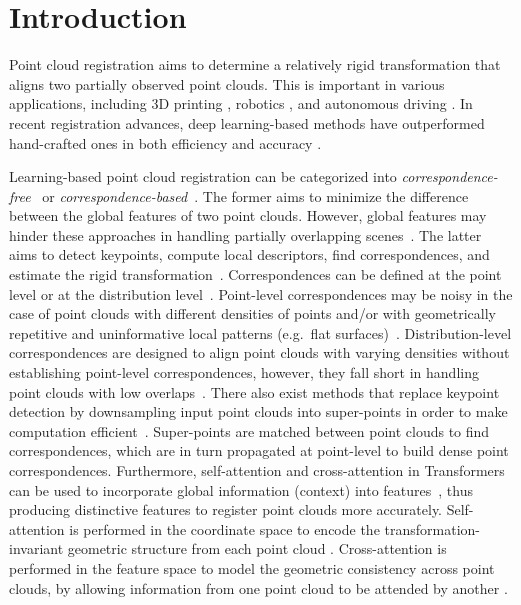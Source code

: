 \section{Introduction}
\label{sec:intro}
\thispagestyle{empty}
Point cloud registration aims to determine a relatively rigid transformation that aligns two partially observed point clouds. 
This is important in various applications, including 3D printing \cite{xie2023bayesian, nie2024t2td}, robotics \cite{kim2018slam}, and autonomous driving \cite{brightman2023point}.
In recent registration advances, deep learning-based methods have outperformed hand-crafted ones in both efficiency and accuracy \cite{choy2019fully, GEDI}.

Learning-based point cloud registration 
can be categorized into \textit{correspondence-free}~\cite{aoki2019pointnetlk, huang2020feature, xu2021omnet, mei2022augfree} or \textit{correspondence-based}~\cite{GEDI, choy2020deep, bai2021pointdsc, huang2021predator, yew2022regtr, corsetti2023revisit, wang2024zeroregzeroshotpointcloud}.
The former aims to minimize the difference between the global features of two point clouds.
However, global features may hinder these approaches in handling partially overlapping scenes~\cite{zhang2020deep, choy2020deep}. 
The latter aims to detect keypoints, compute local descriptors, find correspondences, and estimate the rigid transformation~\cite{huang2021predator,mei2021point}.
Correspondences can be defined at the point level or at the distribution level~\cite{GEDI,wang2023roreg}.
Point-level correspondences may be noisy in the case of point clouds with different densities of points and/or with geometrically repetitive and uninformative local patterns (e.g.~flat surfaces)~\cite{xu2022glorn,mei2023overlap}.
Distribution-level correspondences are designed to align point clouds with varying densities without establishing point-level correspondences, however, they fall short in handling point clouds with low overlaps~\cite{mei2022overlap,huang2022unsupervised}.
There also exist methods that replace keypoint detection by downsampling input point clouds into super-points in order to make computation efficient~\cite{yu2021cofinet}.
Super-points are matched between point clouds to find correspondences, which are in turn propagated at point-level to build dense point correspondences.
Furthermore, self-attention and cross-attention in Transformers~\cite{vaswani2017attention} can be used to incorporate global information (context) into features~\cite{huang2021predator, yu2021cofinet, qin2022geometric}, thus producing distinctive features to register point clouds more accurately.
Self-attention is performed in the coordinate space to encode the transformation-invariant geometric structure from each point cloud \cite{qin2022geometric}.
Cross-attention is performed in the feature space to model the geometric consistency across point clouds, by allowing information from one point cloud to be attended by another \cite{qin2022geometric}.

